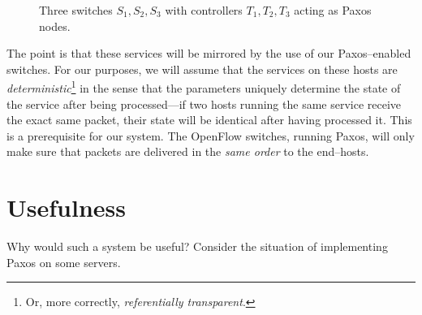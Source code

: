 \begin{figure}[H]
  \centering
  \caption{Three switches $S_1, S_2, S_3$ with controllers $T_1, T_2, T_3$ acting as Paxos nodes.}
  \label{figure:graph.three.switches}
\end{figure}

The point is that these services will be mirrored by the use of our
Paxos--enabled switches.  For our purposes, we will assume that the services
on these hosts are \textit{deterministic}\footnote{Or, more correctly,
\textit{referentially transparent}.} in the sense that the parameters
uniquely determine the state of the service after being processed---if two
hosts running the same service receive the exact same packet, their state
will be identical after having processed it.  This is a prerequisite for our
system.  The OpenFlow switches, running Paxos, will only make sure that
packets are delivered in the \textit{same order} to the end--hosts.

\section{Usefulness}

Why would such a system be useful? Consider the situation of implementing
Paxos on some servers.

